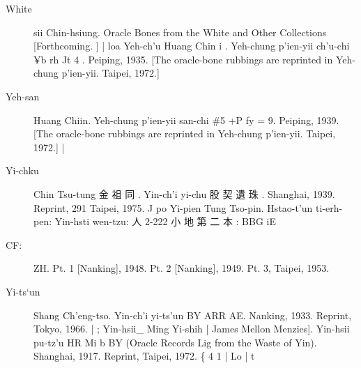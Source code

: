 \begin{description}
  \item[White] sii Chin-hsiung. Oracle Bones from the White and Other Collections [Forthcoming. ] | loa Yeh-ch'u Huang Chin i . Yeh-chung p'ien-yii ch'u-chi ¥b rh Jt 4 . Peiping, 1935. [The oracle-bone rubbings are reprinted in Yeh-chung p'ien-yii. Taipei, 1972.]
  \item[Yeh-san] Huang Chiin. Yeh-chung p'ien-yii san-chi \#5 +P fy = 9. Peiping, 1939. [The oracle-bone rubbings are reprinted in Yeh-chung p'ien-yii. Taipei, 1972.] |
  \item[Yi-chku] Chin Tsu-tung 金 祖 同 . Yin-ch'i yi-chu 股 契 遺 珠 . Shanghai, 1939. Reprint, 291 Taipei, 1975. J po Yi-pien Tung Tso-pin. Hstao-t'un ti-erh-pen: Yin-hsti wen-tzu: 人 2-222 小 地 第 二 本 : BBG iE
  \item[CF:] ZH. Pt. 1 [Nanking], 1948. Pt. 2 [Nanking], 1949. Pt. 3, Taipei, 1953.
  \item[Yi-ts`un] Shang Ch'eng-tso. Yin-ch'i yi-ts'un BY ARR AE. Nanking, 1933. Reprint, Tokyo, 1966. | ; Yin-hsii\_ Ming Yi-shih [ James Mellon Menzies]. Yin-hsii pu-tz'u HR Mi b BY (Oracle Records Lig from the Waste of Yin). Shanghai, 1917. Reprint, Taipei, 1972. \{ 4 1 | Lo | t
\end{description}

